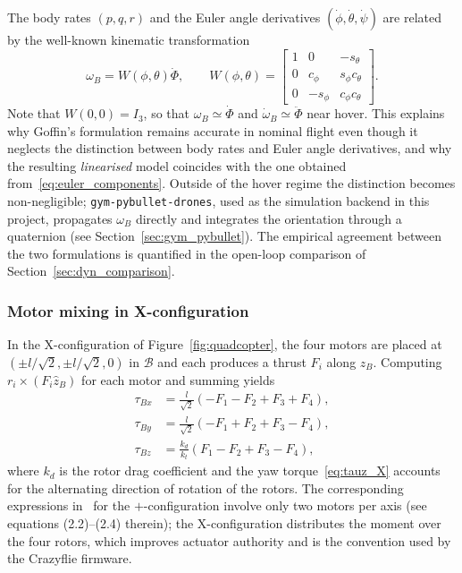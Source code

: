 \documentclass[11pt,a4paper]{article}
\theoremstyle{remark}
\numberwithin{equation}{section}
\begin{document}
The body rates $(p, q, r)$ and the Euler angle derivatives $(\dot\phi, \dot\theta, \dot\psi)$
are related by the well-known kinematic transformation~\cite{goffin2026}
\begin{equation}
\omega_B = W(\phi, \theta) \dot{\Phi}, \qquad
W(\phi, \theta) =
\begin{bmatrix}
1 & 0          & -s_\theta \\
0 & c_\phi     & s_\phi c_\theta \\
0 & -s_\phi    & c_\phi c_\theta
\end{bmatrix}.
\label{eq:kinematic}
\end{equation}
Note that $W(0,0) = I_3$, so that $\omega_B \simeq \dot{\Phi}$ and
$\dot{\omega}_B \simeq \ddot{\Phi}$ near hover. This explains why Goffin's formulation
remains accurate in nominal flight even though it neglects the distinction between body
rates and Euler angle derivatives, and why the resulting \emph{linearised} model coincides
with the one obtained from~\eqref{eq:euler_components}. Outside of the hover regime the
distinction becomes non-negligible; \texttt{gym-pybullet-drones}, used as the simulation
backend in this project, propagates $\omega_B$ directly and integrates the orientation
through a quaternion (see Section~\ref{sec:gym_pybullet}). The empirical agreement between
the two formulations is quantified in the open-loop comparison of
Section~\ref{sec:dyn_comparison}.

\subsubsection*{Motor mixing in X-configuration}

In the X-configuration of Figure~\ref{fig:quadcopter}, the four motors are placed at
$(\pm l/\sqrt{2}, \pm l/\sqrt{2}, 0)$ in $\mathcal{B}$ and each produces a thrust $F_i$
along $z_B$. Computing $r_i \times (F_i \hat z_B)$ for each motor and summing yields
\begin{align}
\tau_{Bx} &= \frac{l}{\sqrt{2}} \left( -F_1 - F_2 + F_3 + F_4 \right), \label{eq:taux_X}\\
\tau_{By} &= \frac{l}{\sqrt{2}} \left( -F_1 + F_2 + F_3 - F_4 \right), \label{eq:tauy_X}\\
\tau_{Bz} &= \frac{k_d}{k_t} \left( F_1 - F_2 + F_3 - F_4 \right), \label{eq:tauz_X}
\end{align}
where $k_d$ is the rotor drag coefficient and the yaw torque~\eqref{eq:tauz_X} accounts
for the alternating direction of rotation of the rotors. The corresponding expressions
in~\cite{goffin2026} for the $+$-configuration involve only two motors per axis
(see equations (2.2)--(2.4) therein); the X-configuration distributes the moment over the
four rotors, which improves actuator authority and is the convention used by the Crazyflie
firmware.
\end{document}
